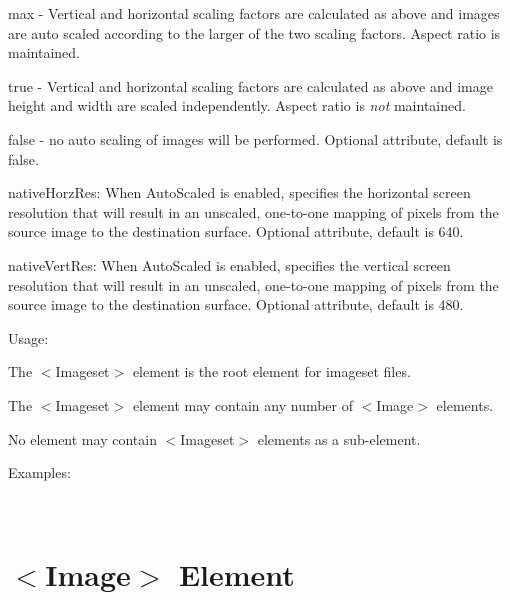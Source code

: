 \begin{DoxyItemize}
\begin{DoxyItemize}
\begin{DoxyItemize}
\item max -\/ Vertical and horizontal scaling factors are calculated as above and images are auto scaled according to the larger of the two scaling factors. Aspect ratio is maintained.
\item true -\/ Vertical and horizontal scaling factors are calculated as above and image height and width are scaled independently. Aspect ratio is {\itshape not} maintained.
\item false -\/ no auto scaling of images will be performed. Optional attribute, default is false.
\end{DoxyItemize}
\item {\ttfamily native\+Horz\+Res\+:} When Auto\+Scaled is enabled, specifies the horizontal screen resolution that will result in an unscaled, one-\/to-\/one mapping of pixels from the source image to the destination surface. Optional attribute, default is 640.
\item {\ttfamily native\+Vert\+Res\+:} When Auto\+Scaled is enabled, specifies the vertical screen resolution that will result in an unscaled, one-\/to-\/one mapping of pixels from the source image to the destination surface. Optional attribute, default is 480.
\end{DoxyItemize}
\item Usage\+:
\begin{DoxyItemize}
\item The $<$Imageset$>$ element is the root element for imageset files.
\item The $<$Imageset$>$ element may contain any number of $<$Image$>$ elements.
\item No element may contain $<$Imageset$>$ elements as a sub-\/element.
\end{DoxyItemize}
\item Examples\+:
\end{DoxyItemize}

~\newline
 \hypertarget{xml_imageset_xml_imageset_image}{}\section{$<$\+Image$>$ Element}\label{xml_imageset_xml_imageset_image}

